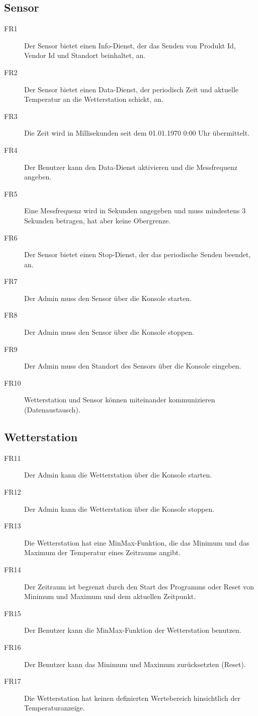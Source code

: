\documentclass[a4paper]{report}
\begin{document}
\subsection{Sensor}
\begin{description}
    \item[FR1] Der Sensor bietet einen Info-Dienst, der das Senden von Produkt Id, Vendor Id und Standort beinhaltet, an.
    \item[FR2] Der Sensor bietet einen Data-Dienst, der periodisch Zeit und aktuelle Temperatur an die Wetterstation schickt, an.
    \item[FR3] Die Zeit wird in Millisekunden seit dem 01.01.1970 0:00 Uhr übermittelt.
    \item[FR4] Der Benutzer kann den Data-Dienst aktivieren und die Messfrequenz angeben.
    \item[FR5] Eine Messfrequenz wird in Sekunden angegeben und muss mindestens 3 Sekunden betragen, hat aber keine Obergrenze.  
    \item[FR6] Der Sensor bietet einen Stop-Dienst, der das periodische Senden beendet, an.
    \item[FR7] Der Admin muss den Sensor über die Konsole starten.
    \item[FR8] Der Admin muss den Sensor über die Konsole stoppen.
    \item[FR9] Der Admin muss den Standort des Sensors über die Konsole eingeben.  
    \item[FR10] Wetterstation und Sensor können miteinander kommunizieren (Datenaustausch).  
\end{description}

\subsection{Wetterstation}
\begin{description}
    \item[FR11] Der Admin kann die Wetterstation über die Konsole starten.
    \item[FR12] Der Admin kann die Wetterstation über die Konsole stoppen.
    \item[FR13] Die Wetterstation hat eine MinMax-Funktion, die das Minimum und das Maximum der Temperatur eines Zeitraums angibt.
    \item[FR14] Der Zeitraum ist begrenzt durch den Start des Programms oder Reset von Minimum und Maximum und dem aktuellen Zeitpunkt.
    \item[FR15] Der Benutzer kann die MinMax-Funktion der Wetterstation benutzen.
    \item[FR16] Der Benutzer kann das Minimum und Maximum zurücksetzten (Reset).
    \item[FR17] Die Wetterstation hat keinen definierten Wertebereich hinsichtlich der Temperaturanzeige. 
\end{description}
\end{document}
